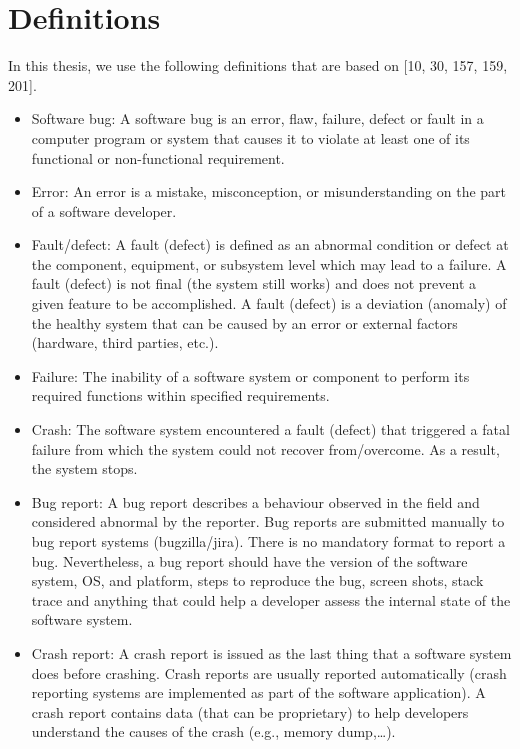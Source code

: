 \documentclass[12pt]{report}
\providecommand{\tightlist}{%
  \setlength{\itemsep}{0pt}\setlength{\parskip}{0pt}}
\begin{document}
\section{\texorpdfstring{Definitions\label{sec:version-control}}{Definitions}}\label{definitions}

In this thesis, we use the following definitions that are based on
{[}10, 30, 157, 159, 201{]}.

\begin{itemize}
\tightlist
\item
  Software bug: A software bug is an error, flaw, failure, defect or
  fault in a computer program or system that causes it to violate at
  least one of its functional or non-functional requirement.
\item
  Error: An error is a mistake, misconception, or misunderstanding on
  the part of a software developer.
\item
  Fault/defect: A fault (defect) is defined as an abnormal condition or
  defect at the component, equipment, or subsystem level which may lead
  to a failure. A fault (defect) is not final (the system still works)
  and does not prevent a given feature to be accomplished. A fault
  (defect) is a deviation (anomaly) of the healthy system that can be
  caused by an error or external factors (hardware, third parties,
  etc.).
\item
  Failure: The inability of a software system or component to perform
  its required functions within specified requirements.
\item
  Crash: The software system encountered a fault (defect) that triggered
  a fatal failure from which the system could not recover from/overcome.
  As a result, the system stops.
\item
  Bug report: A bug report describes a behaviour observed in the field
  and considered abnormal by the reporter. Bug reports are submitted
  manually to bug report systems (bugzilla/jira). There is no mandatory
  format to report a bug. Nevertheless, a bug report should have the
  version of the software system, OS, and platform, steps to reproduce
  the bug, screen shots, stack trace and anything that could help a
  developer assess the internal state of the software system.
\item
  Crash report: A crash report is issued as the last thing that a
  software system does before crashing. Crash reports are usually
  reported automatically (crash reporting systems are implemented as
  part of the software application). A crash report contains data (that
  can be proprietary) to help developers understand the causes of the
  crash (e.g., memory dump,\ldots{}).
\end{itemize}
\end{document}
